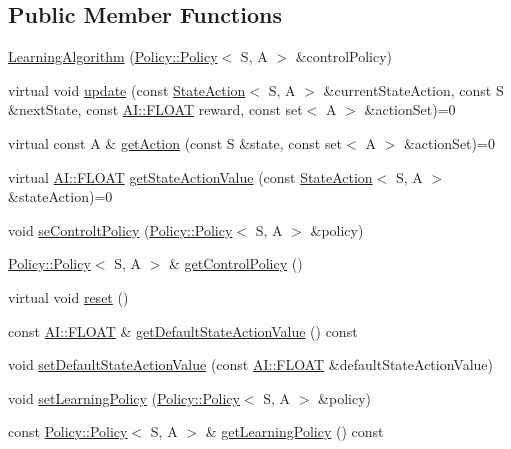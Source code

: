 \subsection*{Public Member Functions}
\begin{DoxyCompactItemize}
\item 
\hyperlink{classAI_1_1Algorithm_1_1LearningAlgorithm_a8fe54228193c0d7a28fba7de00441d7f}{Learning\+Algorithm} (\hyperlink{classAI_1_1Algorithm_1_1Policy_1_1Policy}{Policy\+::\+Policy}$<$ S, A $>$ \&control\+Policy)
\item 
virtual void \hyperlink{classAI_1_1Algorithm_1_1LearningAlgorithm_a7d216d791e558e15a73083af6257ed72}{update} (const \hyperlink{classAI_1_1StateAction}{State\+Action}$<$ S, A $>$ \&current\+State\+Action, const S \&next\+State, const \hyperlink{namespaceAI_a41b74884a20833db653dded3918e05c3}{A\+I\+::\+F\+L\+O\+A\+T} reward, const set$<$ A $>$ \&action\+Set)=0
\item 
virtual const A \& \hyperlink{classAI_1_1Algorithm_1_1LearningAlgorithm_afeca4eded9bc0a02312ccbbfd05f8daa}{get\+Action} (const S \&state, const set$<$ A $>$ \&action\+Set)=0
\item 
virtual \hyperlink{namespaceAI_a41b74884a20833db653dded3918e05c3}{A\+I\+::\+F\+L\+O\+A\+T} \hyperlink{classAI_1_1Algorithm_1_1LearningAlgorithm_a1044b2558109e8dd3d3bf5bedb9723b5}{get\+State\+Action\+Value} (const \hyperlink{classAI_1_1StateAction}{State\+Action}$<$ S, A $>$ \&state\+Action)=0
\item 
void \hyperlink{classAI_1_1Algorithm_1_1LearningAlgorithm_a1d26cb76c945a5312ce4ac4fdabc4d31}{se\+Controlt\+Policy} (\hyperlink{classAI_1_1Algorithm_1_1Policy_1_1Policy}{Policy\+::\+Policy}$<$ S, A $>$ \&policy)
\item 
\hyperlink{classAI_1_1Algorithm_1_1Policy_1_1Policy}{Policy\+::\+Policy}$<$ S, A $>$ \& \hyperlink{classAI_1_1Algorithm_1_1LearningAlgorithm_ab123635bc3d527052051c7f4c37a986c}{get\+Control\+Policy} ()
\item 
virtual void \hyperlink{classAI_1_1Algorithm_1_1LearningAlgorithm_aebe650b79f39ffd46ece7adb44ddaf60}{reset} ()
\item 
const \hyperlink{namespaceAI_a41b74884a20833db653dded3918e05c3}{A\+I\+::\+F\+L\+O\+A\+T} \& \hyperlink{classAI_1_1Algorithm_1_1LearningAlgorithm_aafc85fe7b2ad9331ae41593784321641}{get\+Default\+State\+Action\+Value} () const 
\item 
void \hyperlink{classAI_1_1Algorithm_1_1LearningAlgorithm_a1da99bfa2de96f397a4ef07e53ab5697}{set\+Default\+State\+Action\+Value} (const \hyperlink{namespaceAI_a41b74884a20833db653dded3918e05c3}{A\+I\+::\+F\+L\+O\+A\+T} \&default\+State\+Action\+Value)
\item 
void \hyperlink{classAI_1_1Algorithm_1_1LearningAlgorithm_a826f61675ac11b699c4328c44cccdae5}{set\+Learning\+Policy} (\hyperlink{classAI_1_1Algorithm_1_1Policy_1_1Policy}{Policy\+::\+Policy}$<$ S, A $>$ \&policy)
\item 
const \hyperlink{classAI_1_1Algorithm_1_1Policy_1_1Policy}{Policy\+::\+Policy}$<$ S, A $>$ \& \hyperlink{classAI_1_1Algorithm_1_1LearningAlgorithm_aac506aa1838ba12e2069c098d6faec16}{get\+Learning\+Policy} () const 
\end{DoxyCompactItemize}
